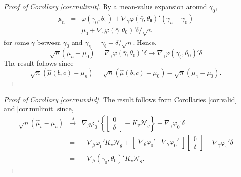 \begin{proof}[Proof of Corollary \ref{cor:mulimit}]
   By a mean-value expansion around $\gamma_0$,
	\begin{eqnarray*}
		\mu_n  &=& \varphi(\gamma_0,\theta_0)+ \nabla_\gamma \varphi(\bar{\gamma},\theta_0)'(\gamma_n - \gamma_0)\\
			&=& \mu_0 + \nabla_\gamma \varphi(\bar{\gamma},\theta_0)' \delta/\sqrt{n}
	\end{eqnarray*}
for some $\bar{\gamma}$ between $\gamma_0$ and $\gamma_n = \gamma_0 +\delta/\sqrt{n}$. Hence,
	$$\sqrt{n}(\mu_n - \mu_0) = \nabla_\gamma \varphi(\bar{\gamma},\theta_0)' \delta \rightarrow \nabla_\gamma \varphi(\gamma_0,\theta_0)' \delta $$
The result follows since
$$\sqrt{n}\left(\widehat{\mu}(b,c) - \mu_n \right)  = \sqrt{n}\left( \widehat{\mu}(b,c) - \mu_0 \right) - \sqrt{n}\left(\mu_n - \mu_0\right).$$
\end{proof}


\begin{proof}[Proof of Corollary \ref{cor:muvalid}]
The result follows from Corollaries \ref{cor:valid} and \ref{cor:mulimit} since,
	\begin{eqnarray*}
		\sqrt{n}\left( \widehat{\mu}_v - \mu_n\right) &\overset{d}{\rightarrow}&\nabla_\beta\varphi_0' \left\{ \left[\begin{array}{c} 0\\ \delta \end{array}\right] -K_v\mathscr{N}_g  \right\}-\nabla_\gamma \varphi_0' \delta\\ 
			&=& -\nabla_\beta\varphi_0' K_v\mathscr{N}_g + \left[\begin{array}{cc} \nabla_\theta\varphi_0'  & \nabla_\gamma\varphi_0' \end{array}\right]\left[\begin{array}{c} 0\\ \delta\end{array}\right]-\nabla_\gamma \varphi_0' \delta\\
			&=& -\nabla_\beta(\gamma_0,\theta_0)' K_v\mathscr{N}_g.
	\end{eqnarray*}
\end{proof}


